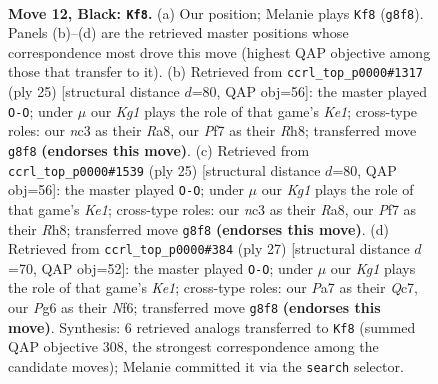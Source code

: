 \documentclass[11pt]{article}
\begin{document}
\clearpage

\begin{figure}[p]\centering
\begin{subfigure}{0.46\textwidth}\centering
\resizebox{\linewidth}{!}{%
\newchessgame
\chessboard[
  setfen={1rbqr1k1/p2pppbp/2p3p1/8/2P1B2P/2N3P1/PP3P2/R1BQ1RK1 b - - 0 12},
  showmover=false,
  pgfstyle=straightmove, color=movearrow, markmove={g8-f8}
]}
\caption{}
\end{subfigure}\hfill
\begin{subfigure}{0.46\textwidth}\centering
\resizebox{\linewidth}{!}{%
\newchessgame
\chessboard[
  setfen={r2qk2r/p2bppbp/2p3p1/2P5/4B3/6P1/PP3P1P/R1BQ1RK1 b kq - 0 13},
  showmover=false,
  pgfstyle=straightmove, color=movearrow, markmove={e8-g8}
]}
\caption{}
\end{subfigure}
\\[4pt]
\begin{subfigure}{0.46\textwidth}\centering
\resizebox{\linewidth}{!}{%
\newchessgame
\chessboard[
  setfen={r2qk2r/p2bppbp/2p3p1/2P5/4B3/6P1/PP3P1P/R1BQ1RK1 b kq - 0 13},
  showmover=false,
  pgfstyle=straightmove, color=movearrow, markmove={e8-g8}
]}
\caption{}
\end{subfigure}\hfill
\begin{subfigure}{0.46\textwidth}\centering
\resizebox{\linewidth}{!}{%
\newchessgame
\chessboard[
  setfen={1rb1k2r/2q2pp1/p1pbpn1p/8/8/2N3P1/PPP1QPBP/R1B1R1K1 b k - 4 14},
  showmover=false,
  pgfstyle=straightmove, color=movearrow, markmove={e8-g8}
]}
\caption{}
\end{subfigure}
\caption{\textbf{Move 12, Black: \texttt{Kf8}.} (a) Our position; Melanie plays \texttt{Kf8} (\texttt{g8f8}). Panels (b)--(d) are the retrieved master positions whose correspondence most drove this move (highest QAP objective among those that transfer to it). (b) Retrieved from \texttt{ccrl\_top\_p0000\#1317} (ply 25) [structural distance $d$=80, QAP obj=56]: the master played \texttt{O-O}; under $\mu$ our \emph{Kg1} plays the role of that game's \emph{Ke1}; cross-type roles: our \emph{n}c3 as their \emph{R}a8, our \emph{P}f7 as their \emph{R}h8; transferred move \texttt{g8f8} \textbf{(endorses this move)}. (c) Retrieved from \texttt{ccrl\_top\_p0000\#1539} (ply 25) [structural distance $d$=80, QAP obj=56]: the master played \texttt{O-O}; under $\mu$ our \emph{Kg1} plays the role of that game's \emph{Ke1}; cross-type roles: our \emph{n}c3 as their \emph{R}a8, our \emph{P}f7 as their \emph{R}h8; transferred move \texttt{g8f8} \textbf{(endorses this move)}. (d) Retrieved from \texttt{ccrl\_top\_p0000\#384} (ply 27) [structural distance $d$=70, QAP obj=52]: the master played \texttt{O-O}; under $\mu$ our \emph{Kg1} plays the role of that game's \emph{Ke1}; cross-type roles: our \emph{P}a7 as their \emph{Q}c7, our \emph{P}g6 as their \emph{N}f6; transferred move \texttt{g8f8} \textbf{(endorses this move)}. Synthesis: 6 retrieved analogs transferred to \texttt{Kf8} (summed QAP objective 308, the strongest correspondence among the candidate moves); Melanie committed it via the \texttt{search} selector.}
\label{fig:thought-m23}
\end{figure}
\end{document}
